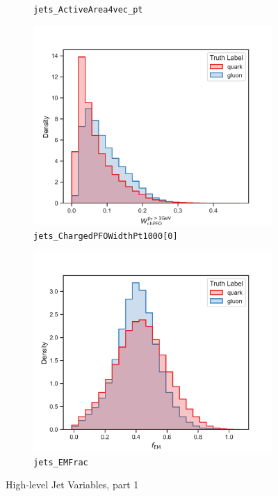 \begin{figure}[!htb]
\begin{subfigure}[t]{0.48\textwidth}
		\caption{\texttt{jets\_ActiveArea4vec\_pt}}
		\label{fig:highlevel_3}
	\end{subfigure}
	\begin{subfigure}[t]{0.48\textwidth}
		\includegraphics[width=1\textwidth]{src/plots/distributions/highlevel/jets_ChargedPFOWidthPt1000[0].png}
		\caption{\texttt{jets\_ChargedPFOWidthPt1000[0]}}
		\label{fig:highlevel_4}
	\end{subfigure}
	\begin{subfigure}[t]{0.48\textwidth}
		\includegraphics[width=1\textwidth]{src/plots/distributions/highlevel/jets_EMFrac.png}
		\caption{\texttt{jets\_EMFrac}}
		\label{fig:highlevel_5}
	\end{subfigure}
\caption{High-level Jet Variables, part 1}
\label{fig:highlevel_0-5}
\end{figure}

